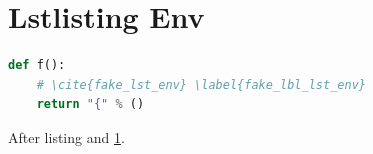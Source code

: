 \documentclass{article}
\begin{document}
\section{Lstlisting Env}\label{sec:env_lst}
\begin{lstlisting}[language=Python]
def f():
    # \cite{fake_lst_env} \label{fake_lbl_lst_env}
    return "{" % ()
\end{lstlisting}
After listing \cite{k1} and \ref{sec:env_lst}.


\end{document}
